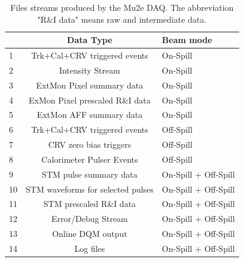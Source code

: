 \begin{table}[htb]
    \centering
    \begin{tabular}{l|c|l} \hline
        & Data Type                           & Beam mode \\ \hline
      1 & Trk+Cal+CRV triggered events        & On-Spill  \\
      2 & Intensity Stream                    & On-Spill  \\
      3 & ExtMon Pixel summary data           & On-Spill  \\
      4 & ExMon Pixel prescaled R\&I data     & On-Spill  \\
      5 & ExtMon AFF summary data             & On-Spill  \\ \hline
      6 & Trk+Cal+CRV triggered events        & Off-Spill \\
      7 & CRV zero bias triggers              & Off-Spill \\
      8 & Calorimeter Pulser Events           & Off-Spill \\ \hline
      9 & STM pulse summary data              & On-Spill + Off-Spill \\ 
      10 & STM waveforms for selected pulses  & On-Spill + Off-Spill \\
      11 & STM prescaled R\&I data            & On-Spill + Off-Spill \\
      12 & Error/Debug Stream                 & On-Spill + Off-Spill \\ \hline
      13 & Online DQM output                  & On-Spill + Off-Spill \\
      14 & Log files                          & On-Spill + Off-Spill \\ \hline
    \end{tabular}
    \caption{Files streams produced by the Mu2e DAQ. The abbreviation "R\&I data" means raw and intermediate data.}
    \label{tab:filestreams}
\end{table}

